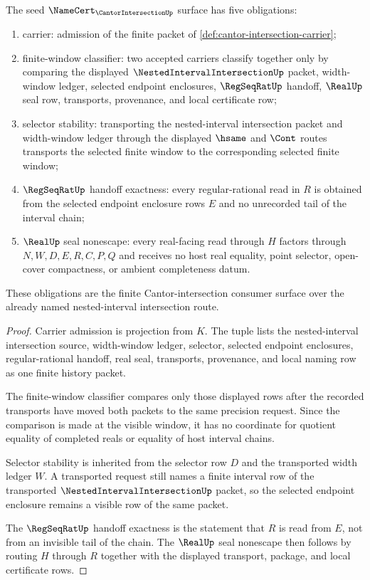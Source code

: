 \begin{theorem}
\label{thm:cantor-intersection-namecert-obligations}
The seed $\NameCert_{\CantorIntersectionUp}$ surface has five obligations:
\begin{enumerate}
\item carrier: admission of the finite packet of \autoref{def:cantor-intersection-carrier};
\item finite-window classifier: two accepted carriers classify together only by comparing the displayed $\NestedIntervalIntersectionUp$ packet, width-window ledger, selected endpoint enclosures, $\RegSeqRatUp$ handoff, $\RealUp$ seal row, transports, provenance, and local certificate row;
\item selector stability: transporting the nested-interval intersection packet and width-window ledger through the displayed $\hsame$ and $\Cont$ routes transports the selected finite window to the corresponding selected finite window;
\item $\RegSeqRatUp$ handoff exactness: every regular-rational read in $R$ is obtained from the selected endpoint enclosure rows $E$ and no unrecorded tail of the interval chain;
\item $\RealUp$ seal nonescape: every real-facing read through $H$ factors through $N,W,D,E,R,C,P,Q$ and receives no host real equality, point selector, open-cover compactness, or ambient completeness datum.
\end{enumerate}
These obligations are the finite Cantor-intersection consumer surface over the already named nested-interval intersection route.
\end{theorem}
\begin{proof}
Carrier admission is projection from $K$. The tuple lists the nested-interval intersection source, width-window ledger, selector, selected endpoint enclosures, regular-rational handoff, real seal, transports, provenance, and local naming row as one finite history packet.

The finite-window classifier compares only those displayed rows after the recorded transports have moved both packets to the same precision request. Since the comparison is made at the visible window, it has no coordinate for quotient equality of completed reals or equality of host interval chains.

Selector stability is inherited from the selector row $D$ and the transported width ledger $W$. A transported request still names a finite interval row of the transported $\NestedIntervalIntersectionUp$ packet, so the selected endpoint enclosure remains a visible row of the same packet.

The $\RegSeqRatUp$ handoff exactness is the statement that $R$ is read from $E$, not from an invisible tail of the chain. The $\RealUp$ seal nonescape then follows by routing $H$ through $R$ together with the displayed transport, package, and local certificate rows.
\end{proof}

